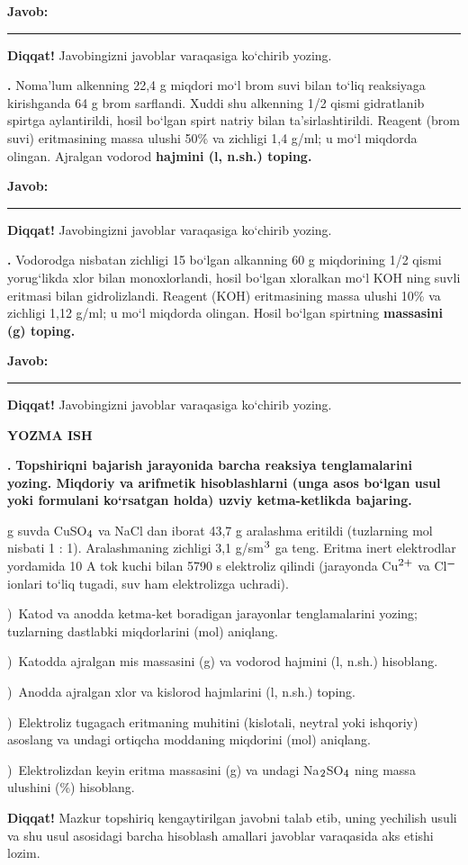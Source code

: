 \documentclass[11pt,a4paper]{article}
\renewcommand{\textsubscript}[1]{\ensuremath{_{\text{\fontsize{8}{8}\selectfont #1}}}}
\renewcommand{\textsuperscript}[1]{\ensuremath{^{\text{\fontsize{8}{8}\selectfont #1}}}}
\newcommand{\qn}[1]{\textbf{\fontsize{11.5}{13}\selectfont #1}}
\newcommand{\qsep}{\par\vspace{13pt}}
\newcommand{\diqqat}[1]{\par\smallskip\noindent\textbf{Diqqat!} #1\par\medskip}
\newcommand{\javob}{\par\nopagebreak[4]\smallskip\noindent\textbf{Javob:} \rule[-2pt]{7.5cm}{0.4pt}\par\smallskip\noindent\textbf{Diqqat!} Javobingizni javoblar varaqasiga ko`chirib yozing.\par\medskip}
\begin{document}
\javob\qsep
\noindent\qn{39.} Noma'lum alkenning 22,4 g miqdori mo`l brom suvi bilan to`liq reaksiyaga kirishganda 64 g brom sarflandi. Xuddi shu alkenning 1/2 qismi gidratlanib spirtga aylantirildi, hosil bo`lgan spirt natriy bilan ta'sirlashtirildi. Reagent (brom suvi) eritmasining massa ulushi 50\% va zichligi 1,4 g/ml; u mo`l miqdorda olingan. Ajralgan vodorod \textbf{hajmini (l, n.sh.) toping.}
\javob\qsep
\noindent\qn{40.} Vodorodga nisbatan zichligi 15 bo`lgan alkanning 60 g miqdorining 1/2 qismi yorug`likda xlor bilan monoxlorlandi, hosil bo`lgan xloralkan mo`l KOH ning suvli eritmasi bilan gidrolizlandi. Reagent (KOH) eritmasining massa ulushi 10\% va zichligi 1,12 g/ml; u mo`l miqdorda olingan. Hosil bo`lgan spirtning \textbf{massasini (g) toping.}
\javob\qsep
\par\bigskip\begin{center}\textbf{\fontsize{13}{15}\selectfont YOZMA ISH}\end{center}
\noindent\qn{41.} \textbf{Topshiriqni bajarish jarayonida barcha reaksiya tenglamalarini yozing. Miqdoriy va arifmetik hisoblashlarni (unga asos bo`lgan usul yoki formulani ko`rsatgan holda) uzviy ketma-ketlikda bajaring.}\par{} g suvda CuSO\textsubscript{4} va NaCl dan iborat 43,7 g aralashma eritildi (tuzlarning mol nisbati 1 : 1). Aralashmaning zichligi 3,1 g/sm\textsuperscript{3} ga teng. Eritma inert elektrodlar yordamida 10 A tok kuchi bilan 5790 s elektroliz qilindi (jarayonda Cu\textsuperscript{2+} va Cl\textsuperscript{$-$} ionlari to`liq tugadi, suv ham elektrolizga uchradi).\par
{})\ Katod va anodda ketma-ket boradigan jarayonlar tenglamalarini yozing; tuzlarning dastlabki miqdorlarini (mol) aniqlang.\par
{})\ Katodda ajralgan mis massasini (g) va vodorod hajmini (l, n.sh.) hisoblang.\par
{})\ Anodda ajralgan xlor va kislorod hajmlarini (l, n.sh.) toping.\par
{})\ Elektroliz tugagach eritmaning muhitini (kislotali, neytral yoki ishqoriy) asoslang va undagi ortiqcha moddaning miqdorini (mol) aniqlang.\par
{})\ Elektrolizdan keyin eritma massasini (g) va undagi Na\textsubscript{2}SO\textsubscript{4} ning massa ulushini (\%) hisoblang.\par
\diqqat{Mazkur topshiriq kengaytirilgan javobni talab etib, uning yechilish usuli va shu usul asosidagi barcha hisoblash amallari javoblar varaqasida aks etishi lozim.}\qsep
\end{document}
